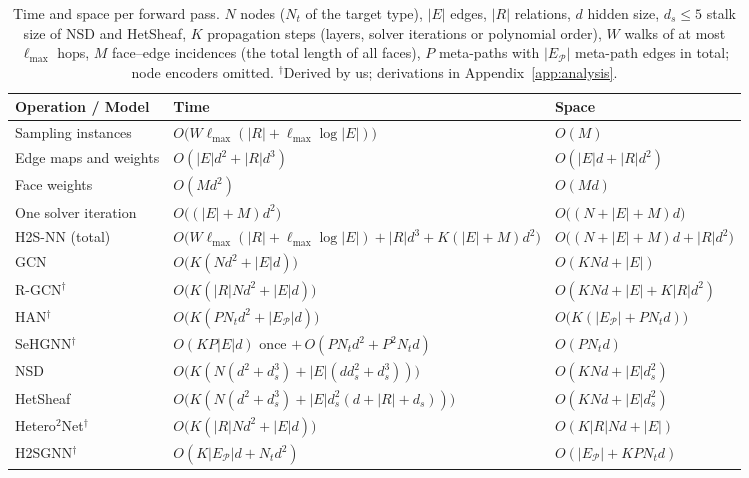 \documentclass{article}
\newcommand{\method}{\textsc{H2S-NN}}
\begin{document}
\begin{table}[!htbp]
  \centering
  \caption{Time and space per forward pass. $N$ nodes ($N_t$ of the target type), $|E|$ edges, $|R|$ relations, $d$ hidden size, $d_s\le5$ stalk size of NSD and HetSheaf, $K$ propagation steps (layers, solver iterations or polynomial order), $W$ walks of at most $\ell_{\max}$ hops, $M$ face--edge incidences (the total length of all faces), $P$ meta-paths with $|E_{\mathcal P}|$ meta-path edges in total; node encoders omitted. $^\dagger$Derived by us; derivations in Appendix~\ref{app:analysis}.}
  \label{tab:complexity}
  \scriptsize
  \setlength{\tabcolsep}{4pt}
  \begin{tabular}{lll}
    \toprule
    \textbf{Operation / Model} & \textbf{Time} & \textbf{Space} \\
    \midrule
    Sampling instances & $O\big(W\ell_{\max}(|R|+\ell_{\max}\log|E|)\big)$ & $O(M)$ \\
    Edge maps and weights & $O(|E|d^2+|R|d^3)$ & $O(|E|d+|R|d^2)$ \\
    Face weights & $O(Md^2)$ & $O(Md)$ \\
    One solver iteration & $O\big((|E|+M)d^2\big)$ & $O\big((N+|E|+M)d\big)$ \\
    \midrule
    \method{} (total) & $O\big(W\ell_{\max}(|R|+\ell_{\max}\log|E|)+|R|d^3+K(|E|+M)d^2\big)$ & $O\big((N+|E|+M)d+|R|d^2\big)$ \\
    \midrule
    GCN & $O\big(K(Nd^2+|E|d)\big)$ & $O(KNd+|E|)$ \\
    R-GCN$^\dagger$ & $O\big(K(|R|Nd^2+|E|d)\big)$ & $O(KNd+|E|+K|R|d^2)$ \\
    HAN$^\dagger$ & $O\big(K(PN_td^2+|E_{\mathcal P}|d)\big)$ & $O\big(K(|E_{\mathcal P}|+PN_td)\big)$ \\
    SeHGNN$^\dagger$ & $O(KP|E|d)$ once $+\,O(PN_td^2+P^2N_td)$ & $O(PN_td)$ \\
    \midrule
    NSD & $O\big(K(N(d^2+d_s^3)+|E|(dd_s^2+d_s^3))\big)$ & $O(KNd+|E|d_s^2)$ \\
    HetSheaf & $O\big(K(N(d^2+d_s^3)+|E|d_s^2(d+|R|+d_s))\big)$ & $O(KNd+|E|d_s^2)$ \\
    \midrule
    Hetero$^2$Net$^\dagger$ & $O\big(K(|R|Nd^2+|E|d)\big)$ & $O(K|R|Nd+|E|)$ \\
    H2SGNN$^\dagger$ & $O(K|E_{\mathcal P}|d+N_td^2)$ & $O(|E_{\mathcal P}|+KPN_td)$ \\
    \bottomrule
  \end{tabular}
\end{table}
\end{document}
